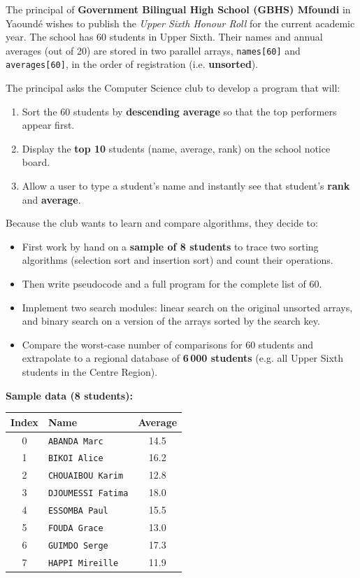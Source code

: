\documentclass[11pt]{article}
\newcounter{popsec}
\newcounter{popsub}
\newcommand{\courssub}[1]{%
  \stepcounter{popsub}%
  \par\vspace{9pt}\noindent{\popxbold\fontsize{11.5}{13}\selectfont\color{popink}{\color{poporange}\thepopsec.\thepopsub}\hspace{6pt}#1}\par\nopagebreak\vspace{4pt}
}
\begin{document}
\courssub{Situation}
\begin{experience}
The principal of \textbf{Government Bilingual High School (GBHS) Mfoundi} in Yaoundé wishes to publish the \emph{Upper Sixth Honour Roll} for the current academic year. The school has 60 students in Upper Sixth. Their names and annual averages (out of 20) are stored in two parallel arrays, \texttt{names[60]} and \texttt{averages[60]}, in the order of registration (i.e. \textbf{unsorted}).

The principal asks the Computer Science club to develop a program that will:
\begin{enumerate}
    \item Sort the 60 students by \textbf{descending average} so that the top performers appear first.
    \item Display the \textbf{top 10} students (name, average, rank) on the school notice board.
    \item Allow a user to type a student's name and instantly see that student's \textbf{rank} and \textbf{average}.
\end{enumerate}

Because the club wants to learn and compare algorithms, they decide to:
\begin{itemize}
    \item First work by hand on a \textbf{sample of 8 students} to trace two sorting algorithms (selection sort and insertion sort) and count their operations.
    \item Then write pseudocode and a full program for the complete list of 60.
    \item Implement two search modules: linear search on the original unsorted arrays, and binary search on a version of the arrays sorted by the search key.
    \item Compare the worst-case number of comparisons for 60 students and extrapolate to a regional database of \textbf{6\,000 students} (e.g. all Upper Sixth students in the Centre Region).
\end{itemize}

\textbf{Sample data (8 students):}
\begin{center}
\begin{tabular}{|c|l|c|}
\hline
\rowcolor{popblueL}\textbf{Index} & \textbf{Name} & \textbf{Average} \\
\hline
0 & \texttt{ABANDA Marc} & 14.5 \\
1 & \texttt{BIKOI Alice} & 16.2 \\
2 & \texttt{CHOUAIBOU Karim} & 12.8 \\
3 & \texttt{DJOUMESSI Fatima} & 18.0 \\
4 & \texttt{ESSOMBA Paul} & 15.5 \\
5 & \texttt{FOUDA Grace} & 13.0 \\
6 & \texttt{GUIMDO Serge} & 17.3 \\
7 & \texttt{HAPPI Mireille} & 11.9 \\
\hline
\end{tabular}
\end{center}


\end{experience}
\end{document}
